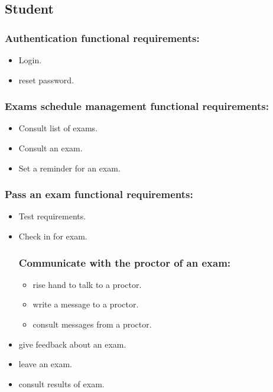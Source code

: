 \documentclass[a4paper,12p]{article}
\begin{document}
     \subsection{Student}
     \begin{itemize}
     \subsubsection{Authentication functional requirements:}
     \begin{itemize}
         \item Login.
         \item reset password.
     \end{itemize}

     \subsubsection{Exams schedule management functional requirements:}
     \begin{itemize}
         \item Consult list of exams.
         \item Consult an exam.
         \item Set a reminder for an exam.
     \end{itemize}

     \subsubsection{Pass an exam functional requirements:}
     \begin{itemize}
         \item Test requirements.
         \item Check in for exam.
         \subsubsection{Communicate with the proctor of an exam:}
         \begin{itemize}
             \item rise hand to talk to a proctor.
             \item write a message to a proctor.
             \item consult messages from a proctor.
         \end{itemize}

         \item give feedback about an exam.
         \item leave an exam.
         \item consult results of exam.
     \end{itemize}


\end{itemize}
\end{document}
